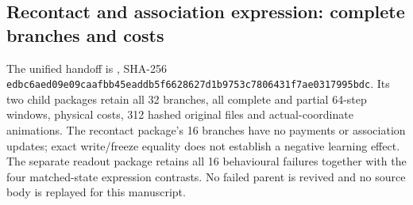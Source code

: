 \subsection*{Recontact and association expression: complete branches and costs}
The unified handoff is , SHA-256 \texttt{edbc6aed\allowbreak{}09e09caa\allowbreak{}fbb45ead\allowbreak{}db5f6628\allowbreak{}627d1b97\allowbreak{}53c78064\allowbreak{}31f7ae03\allowbreak{}17995bdc}. Its two child packages retain all 32 branches, all complete and partial 64-step windows, physical costs, 312 hashed original files and actual-coordinate animations. The recontact package's 16 branches have no payments or association updates; exact write/freeze equality does not establish a negative learning effect. The separate readout package retains all 16 behavioural failures together with the four matched-state expression contrasts. No failed parent is revived and no source body is replayed for this manuscript.

